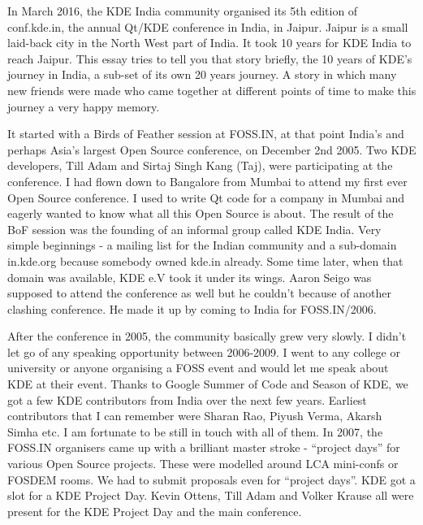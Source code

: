 


\noindent{}In March 2016, the KDE India community organised its 5th edition of conf.kde.in, the annual Qt/KDE conference in India, in Jaipur. Jaipur is a small laid-back city in the North West part of India. It took 10 years for KDE India to reach Jaipur. This essay tries to tell you that story briefly, the 10 years of KDE's journey in India, a sub-set of its own 20 years journey. A story in which many new friends were made who came together at different points of time to make this journey a very happy memory.

It started with a Birds of Feather session at FOSS.IN, at that point India's and perhaps Asia's largest Open Source conference, on December 2nd 2005. Two KDE developers, Till Adam and Sirtaj Singh Kang (Taj), were participating at the conference. I had flown down to Bangalore from Mumbai to attend my first ever Open Source conference. I used to write Qt code for a company in Mumbai and eagerly wanted to know what all this Open Source is about. The result of the BoF session was the founding of an informal group called KDE India. Very simple beginnings - a mailing list for the Indian community and a sub-domain in.kde.org because somebody owned kde.in already. Some time later, when that domain was available, KDE e.V took it under its wings. Aaron Seigo was supposed to attend the conference as well but he couldn't because of another clashing conference. He made it up by coming to India for FOSS.IN/2006.

After the conference in 2005, the community basically grew very slowly. I didn't let go of any speaking opportunity between 2006-2009. I went to any college or university or anyone organising a FOSS event and would let me speak about KDE at their event.  Thanks to Google Summer of Code and Season of KDE, we got a few KDE contributors from India over the next few years. Earliest contributors that I can remember were Sharan Rao, Piyush Verma, Akarsh Simha etc. I am fortunate to be still in touch with all of them. In 2007, the FOSS.IN organisers came up with a brilliant master stroke - “project days” for various Open Source projects. These were modelled around LCA mini-confs or FOSDEM rooms. We had to submit proposals even for “project days”. KDE got a slot for a KDE Project Day.  Kevin Ottens, Till Adam and Volker Krause all were present for the KDE Project Day and the main conference. 

